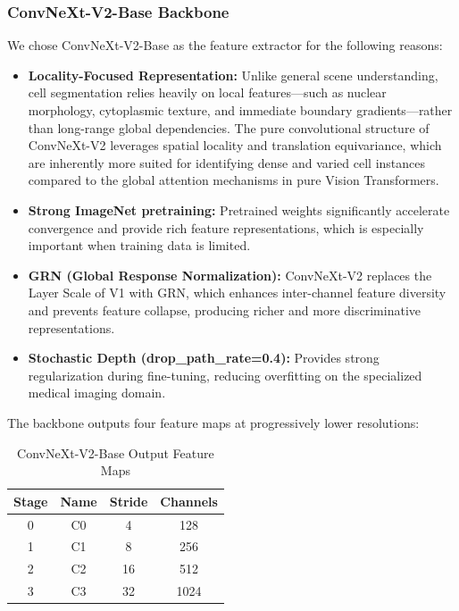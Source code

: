 \documentclass[a4paper]{article} %
\begin{document}
\subsubsection{ConvNeXt-V2-Base Backbone}

We chose ConvNeXt-V2-Base \cite{convnext_v2} as the feature extractor for the following reasons:
\begin{itemize}
    \item \textbf{Locality-Focused Representation:} Unlike general scene understanding, cell segmentation relies heavily on local features—such as nuclear morphology, cytoplasmic texture, and immediate boundary gradients—rather than long-range global dependencies. The pure convolutional structure of ConvNeXt-V2 leverages spatial locality and translation equivariance, which are inherently more suited for identifying dense and varied cell instances compared to the global attention mechanisms in pure Vision Transformers.
    \item \textbf{Strong ImageNet pretraining:} Pretrained weights significantly accelerate convergence and provide rich feature representations, which is especially important when training data is limited.
    \item \textbf{GRN (Global Response Normalization):} ConvNeXt-V2 replaces the Layer Scale of V1 with GRN, which enhances inter-channel feature diversity and prevents feature collapse, producing richer and more discriminative representations.
    \item \textbf{Stochastic Depth (drop\_path\_rate=0.4):} Provides strong regularization during fine-tuning, reducing overfitting on the specialized medical imaging domain.
\end{itemize}

The backbone outputs four feature maps at progressively lower resolutions:

\begin{table}[H]
\centering
\caption{ConvNeXt-V2-Base Output Feature Maps}
\label{tab:backbone_outputs}
\begin{tabular}{cccc}
\toprule
\textbf{Stage} & \textbf{Name} & \textbf{Stride} & \textbf{Channels} \\
\midrule
0 & C0 & 4  & 128  \\
1 & C1 & 8  & 256  \\
2 & C2 & 16 & 512  \\
3 & C3 & 32 & 1024 \\
\bottomrule
\end{tabular}
\end{table}
\end{document}
